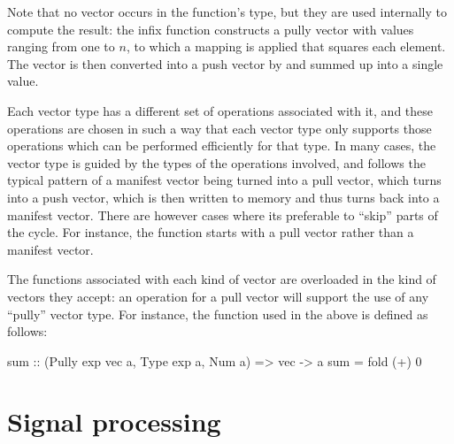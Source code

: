 \documentclass[../paper.tex]{subfiles}
\begin{document}

\noindent Note that no vector occurs in the function's type, but they are used internally to compute the result: the infix function  constructs a pully vector with values ranging from one to $n$, to which a mapping is applied that squares each element. The vector is then converted into a push vector by  and summed up into a single value.

Each vector type has a different set of operations associated with it, and these operations are chosen in such a way that each vector type only supports those operations which can be performed efficiently for that type. In many cases, the vector type is guided by the types of the operations involved, and follows the typical pattern of a manifest vector being turned into a pull vector, which turns into a push vector, which is then written to memory and thus turns back into a manifest vector. There are however cases where its preferable to ``skip'' parts of the cycle. For instance, the  function starts with a pull vector rather than a manifest vector.

The functions associated with each kind of vector are overloaded in the kind of vectors they accept: an operation for a pull vector will support the use of any ``pully'' vector type. For instance, the  function used in the above  is defined as follows:

\begin{code}
sum :: (Pully exp vec a, Type exp a, Num a) => vec -> a
sum = fold (+) 0
\end{code}

\section{Signal processing}
\label{signals}

\end{document}
